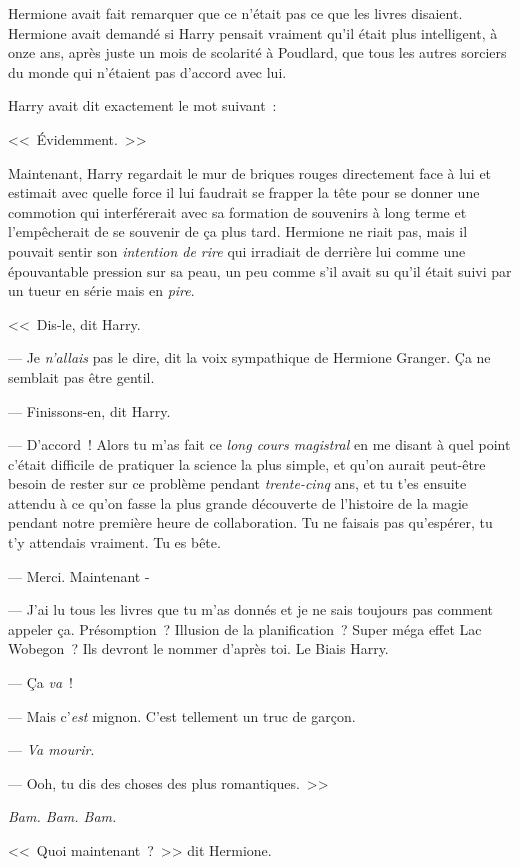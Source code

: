 Hermione avait fait remarquer que ce n'était pas ce que les livres disaient. Hermione avait demandé si Harry pensait vraiment qu'il était plus intelligent, à onze ans, après juste un mois de scolarité à Poudlard, que tous les autres sorciers du monde qui n'étaient pas d'accord avec lui.

Harry avait dit exactement le mot suivant~:

<<~Évidemment.~>>

Maintenant, Harry regardait le mur de briques rouges directement face à lui et estimait avec quelle force il lui faudrait se frapper la tête pour se donner une commotion qui interférerait avec sa formation de souvenirs à long terme et l'empêcherait de se souvenir de ça plus tard. Hermione ne riait pas, mais il pouvait sentir son \emph{intention de rire} qui irradiait de derrière lui comme une épouvantable pression sur sa peau, un peu comme s'il avait su qu'il était suivi par un tueur en série mais en \emph{pire}.

<<~Dis-le, dit Harry.

--- Je \emph{n'allais} pas le dire, dit la voix sympathique de Hermione Granger. Ça ne semblait pas être gentil.

--- Finissons-en, dit Harry.

--- D'accord~! Alors tu m'as fait ce \emph{long cours magistral} en me disant à quel point c'était difficile de pratiquer la science la plus simple, et qu'on aurait peut-être besoin de rester sur ce problème pendant \emph{trente-cinq} ans, et tu t'es ensuite attendu à ce qu'on fasse la plus grande découverte de l'histoire de la magie pendant notre première heure de collaboration. Tu ne faisais pas qu'espérer, tu t'y attendais vraiment. Tu es bête.

--- Merci. Maintenant -

--- J'ai lu tous les livres que tu m'as donnés et je ne sais toujours pas comment appeler ça. Présomption~? Illusion de la planification~? Super méga effet Lac Wobegon~? Ils devront le nommer d'après toi. Le Biais Harry.

--- Ça \emph{va}~!

--- Mais c'\emph{est} mignon. C'est tellement un truc de garçon.

--- \emph{Va mourir}.

--- Ooh, tu dis des choses des plus romantiques.~>>

\emph{Bam. Bam. Bam.}

<<~Quoi maintenant~?~>> dit Hermione.

